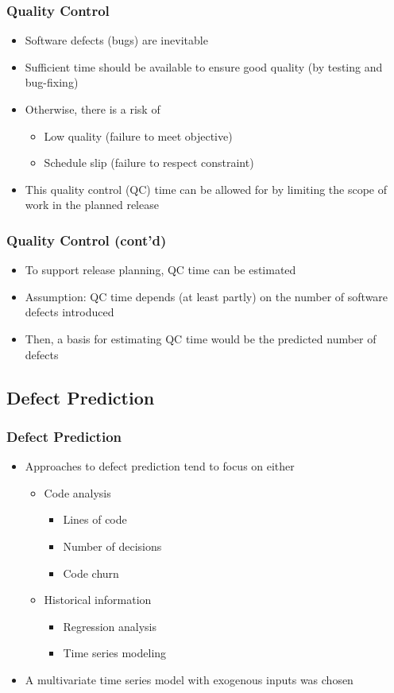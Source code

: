 \documentclass[presentation]{beamer}
\begin{document}
\begin{frame}[t]
\frametitle{Quality Control}
\begin{itemize}
  \item{Software defects (bugs) are inevitable}
  \item{Sufficient time should be available to ensure good quality (by testing and bug-fixing)}
  \item{Otherwise, there is a risk of
    \begin{itemize}
    \item{Low quality (failure to meet objective)}
    \item{Schedule slip (failure to respect constraint)}
    \end{itemize}
  }
  \item{This quality control (QC) time can be allowed for by limiting the scope of work in the planned release}
\end{itemize}
\end{frame}

\begin{frame}[t]
\frametitle{Quality Control (cont'd)}
\begin{itemize}
  \item{To support release planning, QC time can be estimated}
  \item{Assumption: QC time depends (at least partly) on the number of software defects introduced}
  \item{Then, a basis for estimating QC time would be the predicted number of defects}
\end{itemize}
\end{frame}

\subsection{Defect Prediction}

\begin{frame}[t]
\frametitle{Defect Prediction}
\begin{itemize}
  \item{Approaches to defect prediction tend to focus on either
    \begin{itemize}
    \item{Code analysis
      \begin{itemize}
      \item{Lines of code}
      \item{Number of decisions}
      \item{Code churn}
      \end{itemize}
    }
    \item{Historical information
      \begin{itemize}
      \item{Regression analysis}
      \item{Time series modeling}
	  \end{itemize}
	}
    \end{itemize}
  }
  \item{A multivariate time series model with exogenous inputs was chosen}
\end{itemize}
\end{frame}
\end{document}
